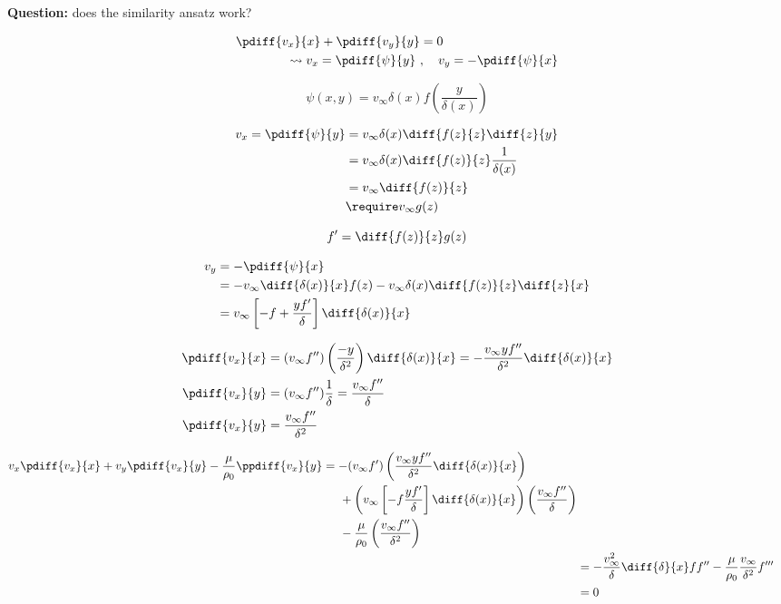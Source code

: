 \noindent\makebox[\linewidth]{\rule{\textwidth}{0.5pt}}

\textbf{Question:} does the similarity ansatz work?

\begin{align}
\pdiff{v_x}{x}+\pdiff{v_y}{y} &= 0 \\
\leadsto
v_x = \pdiff{\psi}{y} \ &, \quad v_y = -\pdiff{\psi}{x}
\end{align}

\begin{equation}
\psi(x,y) = v_\infty\delta(x)f\left(\frac{y}{\delta(x)}\right)
\end{equation}

\begin{align}
v_x=\pdiff{\psi}{y} &= v_\infty\delta(x)\diff{f(z}{z}\diff{z}{y} \\
&= v_\infty \delta(x) \diff{f(z)}{z}\frac{1}{\delta(x)}\\
&= v_\infty \diff{f(z)}{z} \\
&\require v_\infty g(z)
\end{align}

\begin{equation}
f' = \diff{f(z)}{z}g(z)
\end{equation}

\noindent\makebox[\linewidth]{\rule{\textwidth}{0.5pt}}

\begin{align}
v_y &= -\pdiff{\psi}{x} \\
&=  -v_\infty\diff{\delta(x)}{x}f(z) - v_\infty \delta(x)\diff{f(z)}{z}\diff{z}{x}\\
&= v_\infty \left[-f + \frac{y f'}{\delta}\right] \diff{\delta(x)}{x}
\end{align}

\begin{align}
\pdiff{v_x}{x} &= \left(v_\infty f''\right)\left(\frac{-y}{\delta^2}\right)\diff{\delta(x)}{x} = -\frac{v_\infty y f''}{\delta^2}\diff{\delta(x)}{x} \\
\pdiff{v_x}{y} &= (v_\infty f'') \frac{1}{\delta} = \frac{v_\infty f''}{\delta} \\
\pdiff{v_x}{y} &= \frac{v_\infty f''}{\delta^2}
\end{align}

\begin{align}
\begin{split}
v_x\pdiff{v_x}{x} + v_y\pdiff{v_x}{y} - \frac{\mu}{\rho_0}\ppdiff{v_x}{y} &=
-(v_\infty f') \left(\frac{v_\infty y f''}{\delta^2} \diff{\delta(x)}{x}\right) \\
&\hspace{5mm} + \left(v_\infty\left[-f\frac{yf'}{\delta}\right]\diff{\delta(x)}{x}\right) \left(\frac{v_\infty f''}{\delta}\right) \\
&\hspace{5mm} -\frac{\mu}{\rho_0} \left(\frac{v_\infty f''}{\delta^2}\right)
\end{split} \\
&= -\frac{v_\infty^2}{\delta}\diff{\delta}{x} ff'' - \frac{\mu}{\rho_0} \frac{v_\infty}{\delta^2}f'''\\
&= 0
\end{align}

